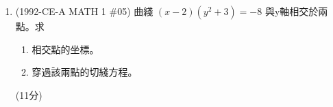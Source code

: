 \documentclass[12pt]{article}
\begin{document}
\begin{enumerate}
            \hrulefill
            
            \hrulefill
            
            \hrulefill
            
            \hrulefill
            
            \hrulefill
            
            \hrulefill
            
            \hrulefill
            
            \hrulefill
            
            \hrulefill
            
            \hrulefill
            
            \hrulefill
            
            \hrulefill
            
            \hrulefill
            
            \hrulefill

        \pagebreak
        \item (1992-CE-A MATH 1 \#05) 曲綫 $(x-2)(y^2+3)=-8$ 與y軸相交於兩點。求\begin{enumerate}
            \item 相交點的坐標。
            \item 穿過該兩點的切綫方程。
        \end{enumerate}\hfill(11分)
        
        \hrulefill
            
            \hrulefill
            
            \hrulefill
            
            \hrulefill
            
            \hrulefill
            
            \hrulefill
            
            \hrulefill
            
            \hrulefill
            
            \hrulefill
            
            \hrulefill
            
            \hrulefill
            
            \hrulefill
            
            \hrulefill
            
            \hrulefill
            
            \hrulefill
            
            \hrulefill
            
            \hrulefill
            
            \hrulefill
            
            \hrulefill
            
            \hrulefill
            
            \hrulefill
            
            \hrulefill

        \pagebreak
    \end{enumerate}
\end{document}
